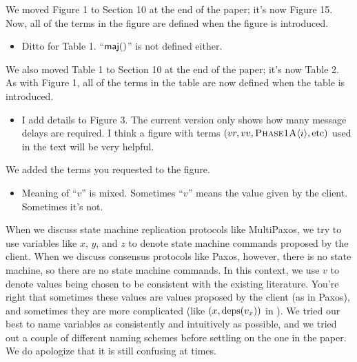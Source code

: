 \documentclass[letterpaper,twocolumn,10pt]{article}
\newenvironment{reviewerquote}
{\list{}{\leftmargin=\parindent\rightmargin=0in}\item[] \itshape \color{ReviewerDarkGray}}%
{\endlist}
\begin{document}
We moved Figure 1 to Section 10 at the end of the paper; it's now Figure 15.
Now, all of the terms in the figure are defined when the figure is introduced.

\begin{reviewerquote}
  \begin{itemize}
    \item
      Ditto for Table 1. ``$\textsf{maj}()$'' is not defined either.
  \end{itemize}
\end{reviewerquote}

We also moved Table 1 to Section 10 at the end of the paper; it's now Table 2.
As with Figure 1, all of the terms in the table are now defined when the table
is introduced.

\begin{reviewerquote}
  \begin{itemize}
    \item
      I add details to Figure 3. The current version only shows how many
      message delays are required. I think a figure with terms $(vr, vv,
      \textsc{Phase1A}\langle{i}\rangle, \text{etc})$ used in the text will be very helpful.
  \end{itemize}
\end{reviewerquote}

We added the terms you requested to the figure.

\begin{reviewerquote}
  \begin{itemize}
    \item
      Meaning of ``$v$'' is mixed. Sometimes ``$v$'' means the value given by
      the client. Sometimes it's not.
  \end{itemize}
\end{reviewerquote}

When we discuss state machine replication protocols like MultiPaxos, we try to
use variables like $x$, $y$, and $z$ to denote state machine commands proposed
by the client. When we discuss consensus protocols like Paxos, however, there
is no state machine, so there are no state machine commands. In this context,
we use $v$ to denote values being chosen to be consistent with the existing
literature. You're right that sometimes these values are values proposed by the
client (as in Paxos), and sometimes they are more complicated (like $(x,
\text{deps}(v_x))$ in \BPaxos{}). We tried our best to name variables as consistently
and intuitively as possible, and we tried out a couple of different naming
schemes before settling on the one in the paper. We do apologize that it is
still confusing at times.
\end{document}
